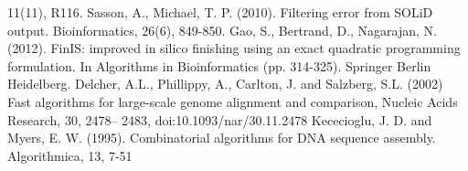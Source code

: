 \documentclass[11pt]{article}
\begin{document}
\begin{thebibliography}{widest entry}
    11(11), R116.
   Sasson, A., Michael, T. P. (2010). Filtering error
    from SOLiD output. Bioinformatics, 26(6), 849-850.
   Gao, S., Bertrand, D., Nagarajan, N. (2012). FinIS: improved
    in silico finishing using an exact quadratic programming formulation. In
    Algorithms in Bioinformatics (pp. 314-325). Springer Berlin Heidelberg.
   Delcher, A.L., Phillippy, A., Carlton, J. and Salzberg, S.L.
    (2002) Fast algorithms for large-scale genome alignment and comparison,
    Nucleic Acids Research, 30, 2478– 2483, doi:10.1093/nar/30.11.2478
   Kececioglu, J. D. and Myers, E. W. (1995). Combinatorial algorithms
    for DNA sequence assembly. Algorithmica, 13, 7-51
\end{thebibliography}
\end{document}
